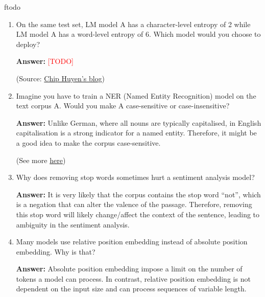 ƒtodo\documentclass{article}
\newenvironment{QandA}{\begin{enumerate}[label=\arabic*.]}{\end{enumerate}}
\newenvironment{answer}{\par\normalfont \textbf{Answer:}}{}
\newcommand{\todo}{\textcolor{red}{[TODO]}}
\begin{document}
\begin{QandA}
\begin{answer}
        (Source: \href{https://en.wikipedia.org/wiki/BLEU}{Wikipedia}, \href{https://www.youtube.com/watch?v=M05L1DhFqcw}{HuggingFace})
    \end{answer}

    \item On the same test set, LM model A has a character-level entropy of 2 while LM model A has a word-level entropy of 6. Which model would you choose to deploy?
    \begin{answer}
        \todo 
        
        (Source: \href{https://thegradient.pub/understanding-evaluation-metrics-for-language-models/}{Chip Huyen's blog})
    \end{answer}

    \item Imagine you have to train a NER (Named Entity Recognition) model on the text corpus A. Would you make A case-sensitive or case-insensitive?
    \begin{answer}
        Unlike German, where all nouns are typically capitalised, in English capitalisation is a strong indicator for a named entity. Therefore, it might be a good idea to make the corpus case-sensitive. 

        (See more \href{https://stackoverflow.com/questions/56384231/case-sensitive-entity-recognition}{here})
    \end{answer}

    \item Why does removing stop words sometimes hurt a sentiment analysis model?
    \begin{answer}
        It is very likely that the corpus contains the stop word ``not'', which is a negation that can alter the valence of the passage. Therefore, removing this stop word will likely change/affect the context of the sentence, leading to ambiguity in the sentiment analysis.
    \end{answer}

    \item Many models use relative position embedding instead of absolute position embedding. Why is that?
    \begin{answer}
        Absolute position embedding impose a limit on the number of tokens a model can process. In contrast, relative position embedding is not dependent on the input size and can process sequences of variable length. 
    \end{answer}


\end{QandA}
\end{document}
